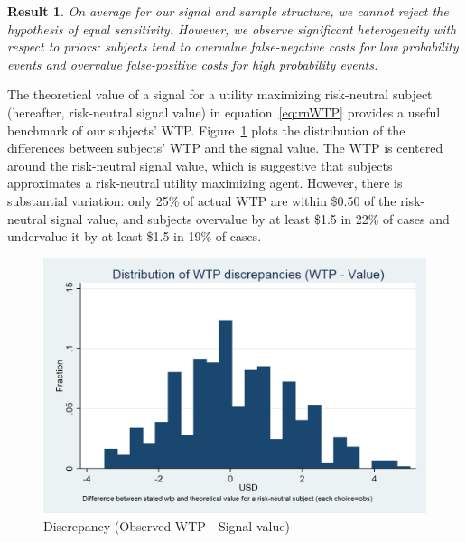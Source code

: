 \documentclass[12pt,a4paper]{article}
\newtheorem{result}{Result}
\begin{document}
\begin{result} 
On average for our signal and sample structure, we cannot reject the hypothesis of equal sensitivity. However, we observe significant heterogeneity with respect to priors: subjects tend to overvalue false-negative costs for low probability events and overvalue false-positive costs for high probability events. 
\end{result}





%

The theoretical value of a signal for a utility maximizing risk-neutral subject (hereafter, risk-neutral signal value) in equation~\ref{eq:rnWTP} provides a useful benchmark of our subjects' WTP. Figure~\ref{fig:WTPhist} plots the distribution of the differences between subjects' WTP and the signal value.  
The WTP is centered around the risk-neutral signal value, which is suggestive that subjects approximates a risk-neutral utility maximizing agent. However, there is substantial variation: only 25\% of actual WTP are within \$0.50 of the risk-neutral signal value, and subjects overvalue by at least \$1.5 in 22\% of cases and undervalue it by at least \$1.5 in 19\% of cases. 

\begin{figure}[H]\centering 
	\includegraphics[scale=0.2]{Graphs/hist_WTP_discr1.png}

\caption{Discrepancy (Observed WTP - Signal value)}\label{fig:WTPhist}
\end{figure}
\end{document}
